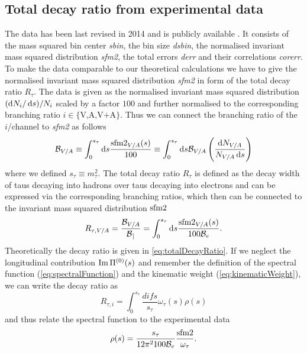 \documentclass[../../index.tex]{subfiles}
\begin{document}
\subsection{Total decay ratio from experimental data}
The data has been last revised in 2014 \cite{Davier2014} and is publicly
available \cite{AlephData}. It consists of the mass squared bin center
\textit{sbin}, the bin size \textit{dsbin}, the normalised invariant mass
squared distribution \textit{sfm2}, the total errors \textit{derr} and their
correlations \textit{corerr}. To make the data comparable to our theoretical
calculations we have to give the normalised invariant mass squared distribution
\textit{sfm2} in form of the total decay ratio \(R_\tau\). The data is given as
the normalised invariant mass squared distribution \((\dif N_i/\dif s)/N_i\)
scaled by a factor \(100\) and further normalised to the corresponding branching
ratio \(i\in\{\text{V,A,V+A}\}\). Thus we can connect the branching ratio of the
\(i\)\-/channel to \textit{sfm2} as follows
\begin{equation}
  \mathcal{B}_{V/A} \equiv \int_0^{s_\tau} \dif s \frac{\sfm2_{V/A}(s)}{100}
  \equiv \int_0^{s_\tau} \dif s \mathcal{B}_{V/A}
  \left( \frac{\dif N_{V/A}}{N_{V/A}\dif s} \right)
\end{equation}
where we defined \(s_\tau \equiv m_\tau^2\). The total decay ratio \(R_\tau\) is
defined as the decay width of taus decaying into hadrons over taus decaying into
electrons and can be expressed via the corresponding branching ratios, which
then can be connected to the invariant mass squared distribution \(\sfm2\)
\begin{equation}
  R_{\tau, V/A} = \frac{\mathcal{B}_{V/A}}{\mathcal{B_e}}
  = \int_0^{s_\tau} \dif s \frac{\sfm2_{V/A}(s)}{100 \mathcal{B}_e}.
\end{equation}
Theoretically the decay ratio is given in \cref{eq:totalDecayRatio}. If we
neglect the longitudinal contribution \(\operatorname{Im} \Pi^{(0)}(s)\) and remember the
definition of the spectral function (\cref{eq:spectralFunction}) and the
kinematic weight (\cref{eq:kinematicWeight}), we can write the decay ratio as
\begin{equation}
  R_{\tau, i} = \int_0^{s_\tau} \frac{dif s}{s_\tau} \omega_\tau(s) \rho(s)
\end{equation}
and thus relate the spectral function to the experimental data
\begin{equation}
  \rho(s) = \frac{s_\tau}{12 \pi^2 100 \mathcal{B}_e} \frac{\sfm2}{\omega_\tau}.
\end{equation}
\end{document}
